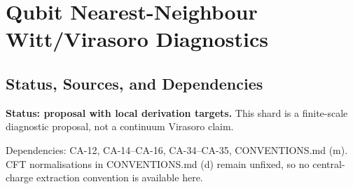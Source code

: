
\section{Qubit Nearest-Neighbour Witt/Virasoro Diagnostics}
\label{sec:qubit-witt-virasoro-diagnostics}

\subsection{Status, Sources, and Dependencies}

\textbf{Status: proposal with local derivation targets.}  This shard is a
finite-scale diagnostic proposal, not a continuum Virasoro claim.

Dependencies: CA-12, CA-14--CA-16, CA-34--CA-35, CONVENTIONS.md (m).  CFT
normalisations in CONVENTIONS.md (d) remain unfixed, so no central-charge
extraction convention is available here.


